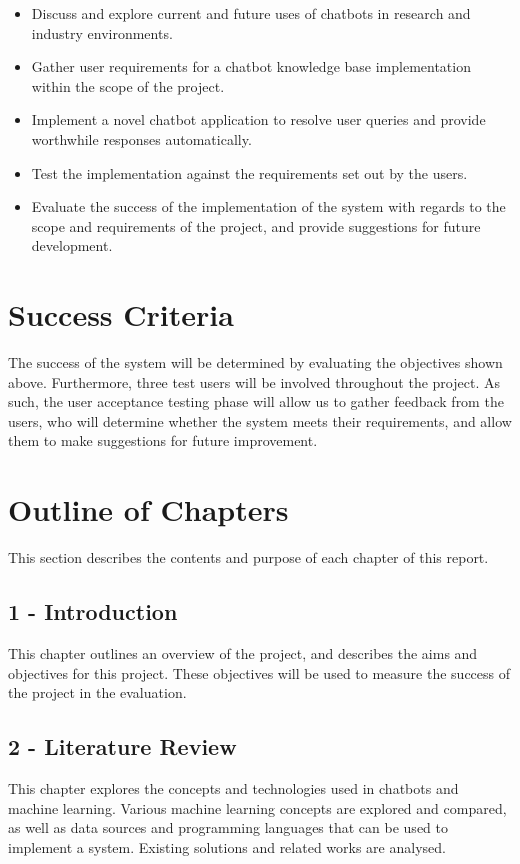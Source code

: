\begin{itemize}
	\itemsep0em 
	\item Discuss and explore current and future uses of chatbots in research and industry environments.
	\item Gather user requirements for a chatbot knowledge base implementation within the scope of the project.
	\item Implement a novel chatbot application to resolve user queries and provide worthwhile responses automatically.
	\item Test the implementation against the requirements set out by the users.
	\item Evaluate the success of the implementation of the system with regards to the scope and requirements of the project, and provide suggestions for future development.
\end{itemize}

\section{Success Criteria}
The success of the system will be determined by evaluating the objectives shown above. Furthermore, three test users will be involved throughout the project. As such, the user acceptance testing phase will allow us to gather feedback from the users, who will determine whether the system meets their requirements, and allow them to make suggestions for future improvement.

\newpage
\section{Outline of Chapters}
This section describes the contents and purpose of each chapter of this report.

\subsection*{1 - Introduction}
This chapter outlines an overview of the project, and describes the aims and objectives for this project. These objectives will be used to measure the success of the project in the evaluation.

\subsection*{2 - Literature Review}
This chapter explores the concepts and technologies used in chatbots and machine learning. Various machine learning concepts are explored and compared, as well as data sources and programming languages that can be used to implement a system. Existing solutions and related works are analysed.

